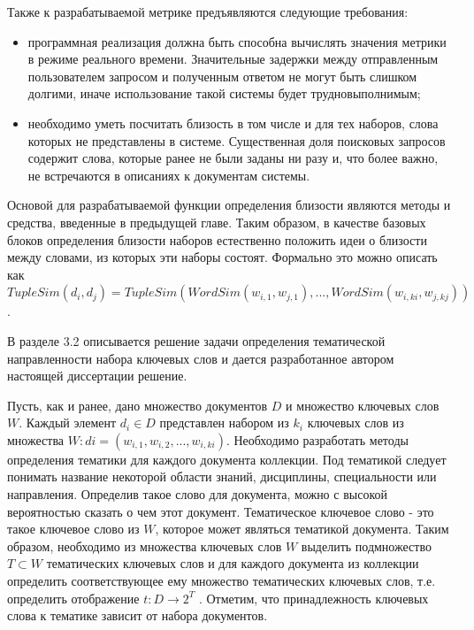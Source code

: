 Также к разрабатываемой метрике предъявляются следующие требования:
\begin{itemize}
    \item программная реализация должна быть способна вычислять значения метрики в режиме реального времени. Значительные задержки между отправленным пользователем запросом и полученным ответом не могут быть слишком долгими, иначе использование такой системы будет трудновыполнимым;
    \item необходимо уметь посчитать близость в том числе и для тех наборов, слова которых не представлены в системе. Существенная доля поисковых запросов содержит слова, которые ранее не были заданы ни разу и, что более важно, не встречаются в описаниях к документам системы.
\end{itemize}

Основой для разрабатываемой функции определения близости являются методы и средства, введенные в предыдущей главе. Таким образом, в качестве базовых  блоков определения близости наборов естественно положить идеи о близости между словами, из которых эти наборы состоят. Формально это можно описать как $TupleSim(d_i, d_j) = TupleSim(WordSim(w_{i,1}, w_{j,1}), ... , WordSim(w_{i,ki}, w_{j,kj}))$. 



В разделе 3.2 описывается решение задачи определения тематической направленности набора ключевых слов и дается разработанное автором настоящей диссертации решение.

Пусть, как и ранее, дано множество документов $D$ и множество ключевых слов $W$. Каждый элемент $d_i \in D$ представлен набором из $k_i$ ключевых слов из множества $W: di = (w_{i,1},w_{i,2},...,w_{i,ki})$. Необходимо разработать методы определения тематики для каждого документа коллекции. Под тематикой следует понимать название некоторой области знаний, дисциплины, специальности или направления. Определив такое слово для документа, можно с высокой вероятностью сказать о чем этот документ. Тематическое ключевое слово - это такое ключевое слово из $W$, которое может являться тематикой документа. Таким образом, необходимо из множества ключевых слов $W$ выделить подмножество $T \subset W$ тематических ключевых слов и для каждого документа из коллекции определить соответствующее ему множество тематических ключевых слов, т.е. определить отображение $t : D \rightarrow 2^T$ . Отметим, что принадлежность ключевых слова к тематике зависит от набора документов.

